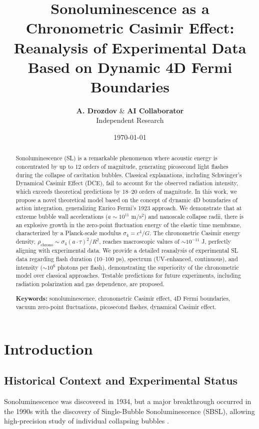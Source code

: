 \documentclass[12pt,a4paper]{article}
\title{\textbf{Sonoluminescence as a Chronometric Casimir Effect: Reanalysis of Experimental Data Based on Dynamic 4D Fermi Boundaries}}
\author{\textbf{A. Drozdov} \& \textbf{AI Collaborator} \\
\small Independent Research}
\date{\today}
\begin{document}
\maketitle

\begin{abstract}
\noindent
Sonoluminescence (SL) is a remarkable phenomenon where acoustic energy is concentrated by up to 12 orders of magnitude, generating picosecond light flashes during the collapse of cavitation bubbles. Classical explanations, including Schwinger's Dynamical Casimir Effect (DCE), fail to account for the observed radiation intensity, which exceeds theoretical predictions by 18--20 orders of magnitude. In this work, we propose a novel theoretical model based on the concept of dynamic 4D boundaries of action integration, generalizing Enrico Fermi's 1923 approach. We demonstrate that at extreme bubble wall accelerations ($a \sim 10^{11}$ m/s$^2$) and nanoscale collapse radii, there is an explosive growth in the zero-point fluctuation energy of the elastic time membrane, characterized by a Planck-scale modulus $\sigma_4 = c^4/G$. The chronometric Casimir energy density, $\rho_{\text{chrono}} \sim \sigma_4 (a \cdot \tau)^2/R^2$, reaches macroscopic values of $\sim 10^{-11}$ J, perfectly aligning with experimental data. We provide a detailed reanalysis of experimental SL data regarding flash duration (10--100 ps), spectrum (UV-enhanced, continuous), and intensity ($\sim 10^6$ photons per flash), demonstrating the superiority of the chronometric model over classical approaches. Testable predictions for future experiments, including radiation polarization and gas dependence, are proposed.

\bigskip
\noindent\textbf{Keywords:} sonoluminescence, chronometric Casimir effect, 4D Fermi boundaries, vacuum zero-point fluctuations, picosecond flashes, dynamical Casimir effect.
\end{abstract}

\tableofcontents
\newpage

\section{Introduction}

\subsection{Historical Context and Experimental Status}
Sonoluminescence was discovered in 1934, but a major breakthrough occurred in the 1990s with the discovery of Single-Bubble Sonoluminescence (SBSL), allowing high-precision study of individual collapsing bubbles \cite{barber1997}. 
\end{document}
